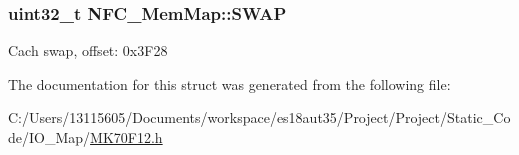\subsubsection[{S\+W\+A\+P}]{\setlength{\rightskip}{0pt plus 5cm}uint32\+\_\+t N\+F\+C\+\_\+\+Mem\+Map\+::\+S\+W\+A\+P}\label{struct_n_f_c___mem_map_acb4d1261ff3c34b54bc5c14496f742ac}
Cach swap, offset\+: 0x3\+F28 

The documentation for this struct was generated from the following file\+:\begin{DoxyCompactItemize}
\item 
C\+:/\+Users/13115605/\+Documents/workspace/es18aut35/\+Project/\+Project/\+Static\+\_\+\+Code/\+I\+O\+\_\+\+Map/\hyperlink{_m_k70_f12_8h}{M\+K70\+F12.\+h}\end{DoxyCompactItemize}
